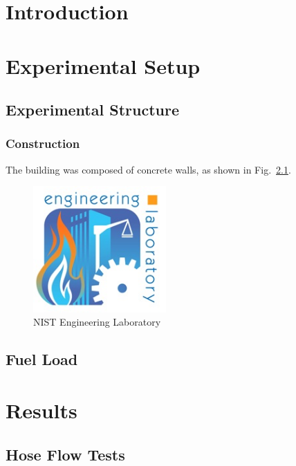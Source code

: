 \documentclass[12pt,oneside]{book}
\begin{document}
\mainmatter

\chapter{Introduction}
\label{chap:Introduction}

\chapter{Experimental Setup}
\label{chap:Experimental_Setup}

\section{Experimental Structure}
\label{sec:Experimental_Structure}

\subsection{Construction}
\label{sec:Construction}
The building was composed of concrete walls, as shown in Fig.~\ref{fig:EL_Logo_Example}.

\begin{figure}[!ht]
\includegraphics[width=2in]{../Figures/el_logo_small}
\caption{NIST Engineering Laboratory}
\label{fig:EL_Logo_Example}
\end{figure}

\section{Fuel Load}

\chapter{Results}
\label{chap:Results}

\section{Hose Flow Tests}
\end{document}
